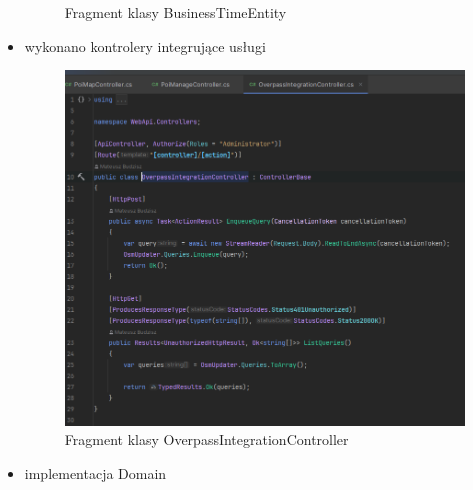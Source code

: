 \begin{itemize}
\begin{figure}[H]
            \caption{Fragment klasy BusinessTimeEntity}
            \label{fig:figure5}
            \end{figure}
        \item wykonano kontrolery integrujące usługi
        \begin{figure}[H]
            \centering
            \includegraphics[width=1\textwidth]{attachments/OverpassIntegrationController}
            \caption{Fragment klasy OverpassIntegrationController}
            \label{fig:figure6}
            \end{figure}
        \item implementacja Domain
        \begin{figure}[H]
            \centering

\end{figure}
\end{itemize}
